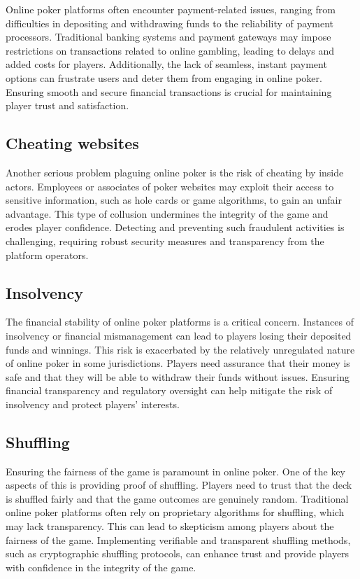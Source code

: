 \documentclass{article}
\begin{document}
Online poker platforms often encounter payment-related issues, ranging from difficulties in depositing and withdrawing funds to the reliability of payment processors. Traditional banking systems and payment gateways may impose restrictions on transactions related to online gambling, leading to delays and added costs for players. Additionally, the lack of seamless, instant payment options can frustrate users and deter them from engaging in online poker. Ensuring smooth and secure financial transactions is crucial for maintaining player trust and satisfaction.

\subsection{Cheating websites}

Another serious problem plaguing online poker is the risk of cheating by inside actors. Employees or associates of poker websites may exploit their access to sensitive information, such as hole cards or game algorithms, to gain an unfair advantage. This type of collusion undermines the integrity of the game and erodes player confidence. Detecting and preventing such fraudulent activities is challenging, requiring robust security measures and transparency from the platform operators.

\subsection{Insolvency}

The financial stability of online poker platforms is a critical concern. Instances of insolvency or financial mismanagement can lead to players losing their deposited funds and winnings. This risk is exacerbated by the relatively unregulated nature of online poker in some jurisdictions. Players need assurance that their money is safe and that they will be able to withdraw their funds without issues. Ensuring financial transparency and regulatory oversight can help mitigate the risk of insolvency and protect players' interests.

\subsection{Shuffling}

Ensuring the fairness of the game is paramount in online poker. One of the key aspects of this is providing proof of shuffling. Players need to trust that the deck is shuffled fairly and that the game outcomes are genuinely random. Traditional online poker platforms often rely on proprietary algorithms for shuffling, which may lack transparency. This can lead to skepticism among players about the fairness of the game. Implementing verifiable and transparent shuffling methods, such as cryptographic shuffling protocols, can enhance trust and provide players with confidence in the integrity of the game.
\end{document}
